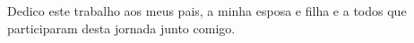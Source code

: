 \thispagestyle{empty}%
\null\vfill
\begin{flushright}
Dedico este trabalho aos meus pais, a minha esposa e filha e a todos que participaram desta jornada junto comigo.
\end{flushright}
